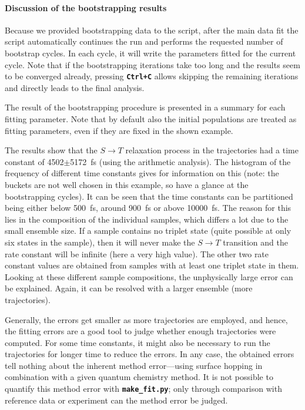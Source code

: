 \documentclass[a4paper,11pt,DIV=15,openany]{scrbook}
\newcommand{\ttt}[1]{\textbf{\texttt{#1}}}
\begin{document}
\paragraph{Discussion of the bootstrapping results}

Because we provided bootstrapping data to the script, after the main data fit the script automatically continues the run and performs the requested number of bootstrap cycles.
In each cycle, it will write the parameters fitted for the current cycle.
Note that if the bootstrapping iterations take too long and the results seem to be converged already, pressing \ttt{Ctrl+C} allows skipping the remaining iterations and directly leads to the final analysis.

The result of the bootstrapping procedure is presented in a summary for each fitting parameter.
Note that by default also the initial populations are treated as fitting parameters, even if they are fixed in the shown example.

The results show that the $S\rightarrow T$ relaxation process in the trajectories had a time constant of 4502$\pm$5172~fs (using the arithmetic analysis). 
The histogram of the frequency of different time constants gives for information on this (note: the buckets are not well chosen in this example, so have a glance at the bootstrapping cycles). It can be seen that the time constants can be partitioned being either below 500~fs, around 900~fs or above 10000~fs. 
The reason for this lies in the composition of the individual samples, which differs a lot due to the small ensemble size. 
If a sample contains no triplet state (quite possible at only six states in the sample), then it will never make the $S\rightarrow T$ transition and the rate constant will be infinite (here a very high value). 
The other two rate constant values are obtained from samples with at least one triplet state in them. Looking at these different sample compositions, the unphysically large error can be explained. 
Again, it can be resolved with a larger ensemble (more trajectories).

Generally, the errors get smaller as more trajectories are employed, and hence, the fitting errors are a good tool to judge whether enough trajectories were computed.
For some time constants, it might also be necessary to run the trajectories for longer time to reduce the errors.
In any case, the obtained errors tell nothing about the inherent method error---using surface hopping in combination with a given quantum chemistry method.
It is not possible to quantify this method error with \ttt{make\_fit.py}; only through comparison with reference data or experiment can the method error be judged.
\end{document}
